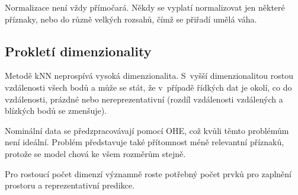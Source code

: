 Normalizace není vždy přímočará. Někdy se vyplatí normalizovat jen některé příznaky, nebo do různě velkých rozsahů, čímž se přiřadí umělá váha.

\subsection{Prokletí dimenzionality}

Metodě kNN neprospívá vysoká dimenzionalita. S~vyšší dimenzionalitou rostou vzdálenosti všech bodů a může se stát, že v~případě řídkých dat je okolí, co do vzdálenosti, prázdné nebo nereprezentativní (rozdíl vzdálenosti vzdálených a blízkých bodů se zmenšuje).

Nominální data se předzpracovávají pomocí OHE, což kvůli těmto problémům není ideální. Problém představuje také přítomnost méně relevantní příznaků, protože se model chová ke všem rozměrům stejně.

Pro rostoucí počet dimenzí významně roste potřebný počet prvků pro zaplnění prostoru a reprezentativní predikce.
